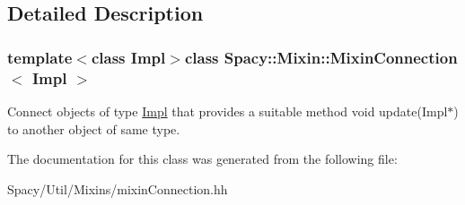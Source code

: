\subsection{Detailed Description}
\subsubsection*{template$<$class Impl$>$class Spacy\+::\+Mixin\+::\+Mixin\+Connection$<$ Impl $>$}

Connect objects of type \hyperlink{classSpacy_1_1Mixin_1_1Impl}{Impl} that provides a suitable method void update(\+Impl$\ast$) to another object of same type. 

The documentation for this class was generated from the following file\+:\begin{DoxyCompactItemize}
\item 
Spacy/\+Util/\+Mixins/mixin\+Connection.\+hh\end{DoxyCompactItemize}
